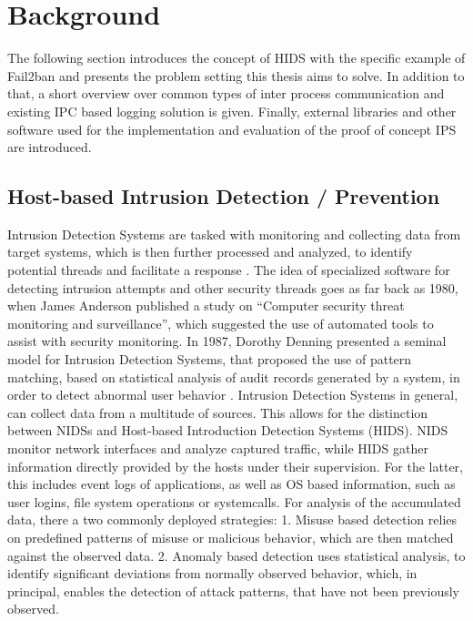 %
%

\chapter{Background} \label{sec:background}

The following section introduces the concept of \ac{HIDS} with the specific example of Fail2ban and presents the problem setting 
this thesis aims to solve. In addition to that, a short overview over common types of inter process communication and existing \ac{IPC} based logging solution is given. 
Finally, external libraries and other software used for the implementation and evaluation of the proof of concept \ac{IPS} are introduced.    

\section{Host-based Intrusion Detection / Prevention} \label{sec:hids}

Intrusion Detection Systems are tasked with monitoring and collecting data from target systems, which is then further processed and analyzed, to identify 
potential threads and facilitate a response \cite{vigna2006}.
The idea of specialized software for detecting intrusion attempts and other 
security threads goes as far back as 1980, when James Anderson published a study on 
``Computer security threat monitoring and surveillance'', which suggested the use of automated tools to assist with security monitoring\cite{anderson1980}. In 1987, Dorothy
Denning presented a seminal model for Intrusion Detection Systems, that proposed the use of pattern matching, based on
statistical analysis of audit records generated by a system, in order to detect abnormal user behavior \cite{denning1987}. 
Intrusion Detection Systems in general, can collect data from a multitude of sources. This allows for the distinction between \acp{NIDS} and Host-based Introduction Detection Systems (\ac{HIDS}). \ac{NIDS}
monitor network interfaces and analyze captured traffic, while \ac{HIDS} gather information directly provided by the hosts under their supervision. For the latter, this includes event logs of applications, as well as \ac{OS} based information,
such as user logins, file system operations or systemcalls. For analysis of the accumulated data, there a two commonly deployed strategies: 1. Misuse based detection relies on predefined 
patterns of misuse or malicious behavior, which are then matched against the observed data. 2. Anomaly based detection uses statistical analysis, to identify significant deviations
from normally observed behavior, which, in principal, enables the detection of attack patterns, that have not been previously observed. \cite{vigna2006} 

